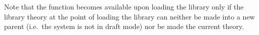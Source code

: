 Note that the function  becomes available upon loading the
 library only if the library theory  at the point
of loading the library can neither be made into a new parent (i.e.\ the system
is not in draft mode) nor be made the current
theory.

